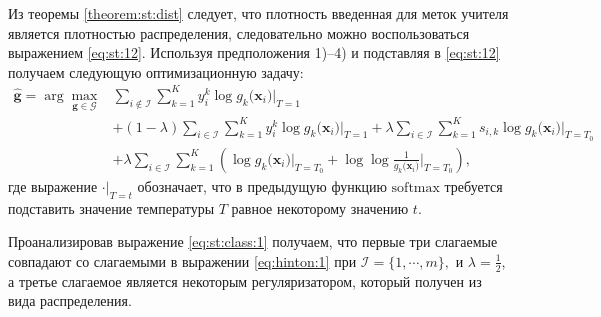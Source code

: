Из теоремы \ref{theorem:st:dist} следует, что плотность введенная для меток учителя является плотностью распределения, следовательно можно воспользоваться выражением \eqref{eq:st:12}.
Используя предположения 1)--4) и подставляя в \eqref{eq:st:12} получаем следующую оптимизационную задачу:
\[
\label{eq:st:class:1}
\begin{aligned}
\hat{\mathbf{g}} = \arg\max_{\mathbf{g}\in \mathcal{G}} & \sum_{i\not\in \mathcal{I}}\sum_{k=1}^{K}y_i^k\log g_k\bigr(\mathbf{x}_i\bigr)\bigr|_{T=1} \\
&+ \left(1-\lambda\right)\sum_{i\in \mathcal{I}}\sum_{k=1}^{K}y_i^k\log g_k\bigr(\mathbf{x}_i\bigr)\bigr|_{T=1} + \lambda\sum_{i\in \mathcal{I}}\sum_{k=1}^{K}s_{i,k}\log g_k\bigr(\mathbf{x}_i\bigr)\bigr|_{T=T_0} \\
&+ \lambda \sum_{i\in \mathcal{I}}\sum_{k=1}^{K}\left(\log g_k\bigr(\mathbf{x}_i\bigr)\bigr|_{T=T_0} + \log\log\frac{1}{g_k\bigr(\mathbf{x}_i\bigr)}\bigr|_{T=T_0}\right),
\end{aligned}
\]
где выражение $\cdot\bigr|_{T=t}$ обозначает, что в предыдущую функцию $\text{softmax}$ требуется подставить значение температуры $T$ равное некоторому значению $t$.

Проанализировав выражение \eqref{eq:st:class:1} получаем, что первые три слагаемые совпадают со слагаемыми в выражении \eqref{eq:hinton:1} при $\mathcal{I} = \{1, \cdots, m\},$ и $\lambda=\frac{1}{2}$, а третье слагаемое является некоторым регуляризатором, который получен из вида распределения.


